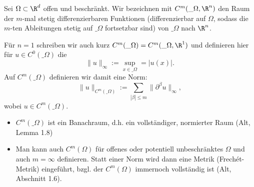 \begin{df} \label{1.3}
	Sei $\Omega \subset \R^d$ offen und beschränkt.
	Wir bezeichnen mit $C^m(\_\Omega, \R^n)$ den Raum der $m$-mal stetig differenzierbaren Funktionen (differenzierbar auf $\Omega$, sodass die $m$-ten Ableitungen stetig auf $\_\Omega$ fortsetzbar sind) von $\_\Omega$ nach $\R^n$.

	Für $n = 1$ schreiben wir auch kurz $C^m(\_\Omega) = C^m(\_\Omega, \R^1)$ und definieren hier für $u \in C^0(\_\Omega)$ die 
	\[
		\|u\|_\infty := \sup_{x\in \_\Omega} = |u(x)|.
	\]
	Auf $C^m(\_\Omega)$ definieren wir damit eine Norm:
	\[
		\|u\|_{C^m(\_\Omega)} := \sum_{|\beta| \le m} \|\partial^\beta u\|_\infty,
	\]
	wobei $u \in C^m(\_\Omega)$.
	\begin{note}
		\begin{itemize}
			\item
				$C^m(\_\Omega)$ ist ein Banachraum, d.h. ein vollständiger, normierter Raum (Alt, Lemma 1.8)
			\item
				Man kann auch $C^m(\Omega)$ für offenes oder potentiell unbeschränktes $\Omega$ und auch $m = \infty$ definieren.
				Statt einer Norm wird dann eine Metrik (Frechét-Metrik) eingeführt, bzgl. der $C^m(\Omega)$ immernoch vollständig ist (Alt, Abschnitt 1.6).
		\end{itemize}
	\end{note}
\end{df}

